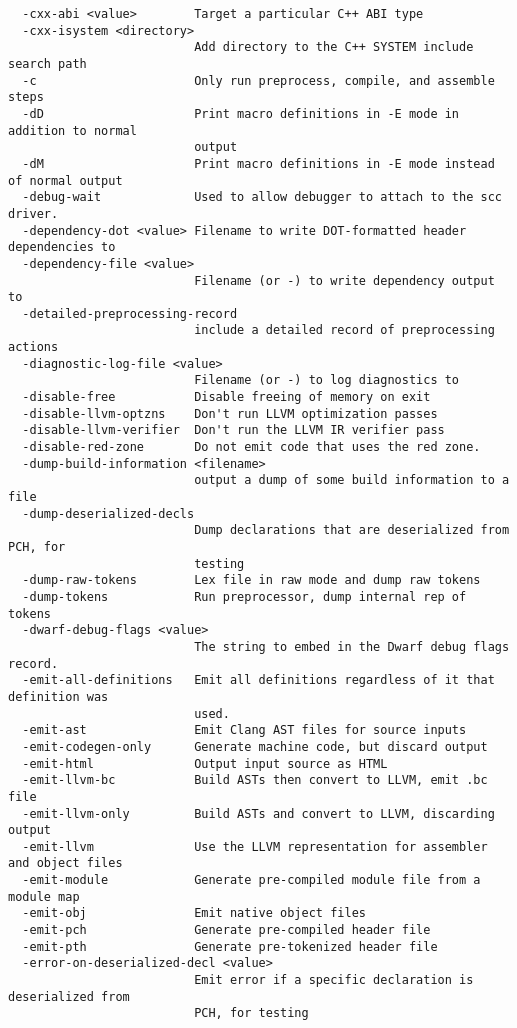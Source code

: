 \begin{verbatim}
  -cxx-abi <value>        Target a particular C++ ABI type
  -cxx-isystem <directory>
                          Add directory to the C++ SYSTEM include search path
  -c                      Only run preprocess, compile, and assemble steps
  -dD                     Print macro definitions in -E mode in addition to normal 
                          output
  -dM                     Print macro definitions in -E mode instead of normal output
  -debug-wait             Used to allow debugger to attach to the scc driver.
  -dependency-dot <value> Filename to write DOT-formatted header dependencies to
  -dependency-file <value>
                          Filename (or -) to write dependency output to
  -detailed-preprocessing-record
                          include a detailed record of preprocessing actions
  -diagnostic-log-file <value>
                          Filename (or -) to log diagnostics to
  -disable-free           Disable freeing of memory on exit
  -disable-llvm-optzns    Don't run LLVM optimization passes
  -disable-llvm-verifier  Don't run the LLVM IR verifier pass
  -disable-red-zone       Do not emit code that uses the red zone.
  -dump-build-information <filename>
                          output a dump of some build information to a file
  -dump-deserialized-decls
                          Dump declarations that are deserialized from PCH, for 
                          testing
  -dump-raw-tokens        Lex file in raw mode and dump raw tokens
  -dump-tokens            Run preprocessor, dump internal rep of tokens
  -dwarf-debug-flags <value>
                          The string to embed in the Dwarf debug flags record.
  -emit-all-definitions   Emit all definitions regardless of it that definition was 
                          used.
  -emit-ast               Emit Clang AST files for source inputs
  -emit-codegen-only      Generate machine code, but discard output
  -emit-html              Output input source as HTML
  -emit-llvm-bc           Build ASTs then convert to LLVM, emit .bc file
  -emit-llvm-only         Build ASTs and convert to LLVM, discarding output
  -emit-llvm              Use the LLVM representation for assembler and object files
  -emit-module            Generate pre-compiled module file from a module map
  -emit-obj               Emit native object files
  -emit-pch               Generate pre-compiled header file
  -emit-pth               Generate pre-tokenized header file
  -error-on-deserialized-decl <value>
                          Emit error if a specific declaration is deserialized from 
                          PCH, for testing

\end{verbatim}
